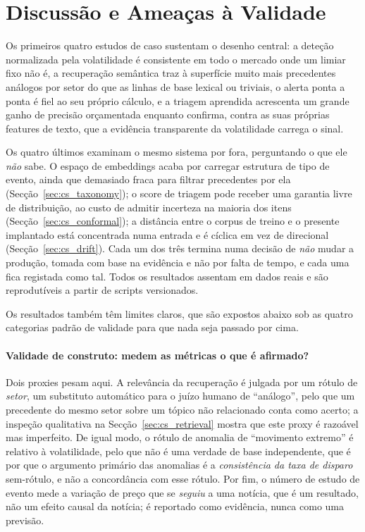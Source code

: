 \section{Discussão e Ameaças à Validade}
\label{sec:cs_discussion}

Os primeiros quatro estudos de caso sustentam o desenho central: a deteção normalizada pela
volatilidade é consistente em todo o mercado onde um limiar fixo não é, a recuperação semântica traz à
superfície muito mais precedentes análogos por setor do que as linhas de base lexical ou triviais, o
alerta ponta a ponta é fiel ao seu próprio cálculo, e a triagem aprendida acrescenta um grande ganho
de precisão orçamentada enquanto confirma, contra as suas próprias features de texto, que a evidência
transparente da volatilidade carrega o sinal.

Os quatro últimos examinam o mesmo sistema por fora, perguntando o que ele \emph{não} sabe. O espaço
de embeddings acaba por carregar estrutura de tipo de evento, ainda que demasiado fraca para filtrar
precedentes por ela (Secção~\ref{sec:cs_taxonomy}); o score de triagem pode receber uma garantia
livre de distribuição, ao custo de admitir incerteza na maioria dos itens
(Secção~\ref{sec:cs_conformal}); a distância entre o corpus de treino e o presente implantado está
concentrada numa entrada e é cíclica em vez de direcional (Secção~\ref{sec:cs_drift}). Cada um dos
três termina numa decisão de \emph{não} mudar a
produção, tomada com base na evidência e não por falta de tempo, e cada uma fica registada como tal.
Todos os resultados assentam em dados reais e são reprodutíveis a partir de scripts versionados.

Os resultados também têm limites claros, que são expostos abaixo sob as quatro categorias padrão de validade
para que nada seja passado por cima.

\paragraph{Validade de construto: medem as métricas o que é afirmado?} Dois proxies pesam aqui. A relevância da
recuperação é julgada por um rótulo de \emph{setor}, um substituto automático para o juízo humano de
``análogo'', pelo que um precedente do mesmo setor sobre um tópico não relacionado conta como acerto; a
inspeção qualitativa na Secção~\ref{sec:cs_retrieval} mostra que este proxy é razoável mas imperfeito. De igual
modo, o rótulo de anomalia de ``movimento extremo'' é relativo à volatilidade, pelo que não é uma verdade de
base independente, que é por que o argumento primário das anomalias é a \emph{consistência da taxa de disparo}
sem-rótulo, e não a concordância com esse rótulo. Por fim, o número de estudo de evento mede a variação de
preço que se \emph{seguiu} a uma notícia, que é um resultado, não um efeito causal da notícia; é reportado como
evidência, nunca como uma previsão.


